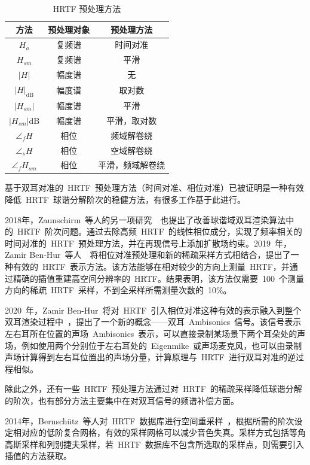 \begin{table}[H]
\caption{HRTF 预处理方法}
\centering
\begin{tabular}{|c|c|c|}
\hline
方法 & 预处理对象 & 预处理方法 \\
\hline
$H_{a}$ & 复频谱 & 时间对准 \\
$H_{s m}$ & 复频谱 & 平滑 \\
$|H|$ & 幅度谱 & 无 \\
$|H|_{\mathrm{dB}}$ & 幅度谱 & 取对数 \\
$\left|H_{s m}\right|$ & 幅度谱 & 平滑 \\
$\left|H_{s m}\right| \mathrm{d} \mathrm{B}$ & 幅度谱 & 平滑，取对数\\
$\angle_{f} H$ & 相位 & 频域解卷绕 \\
$\angle_{s} H$ & 相位 & 空域解卷绕 \\
$\angle_{f} H_{s m}$ & 相位 & 平滑，频域解卷绕\\
\hline
\end{tabular}
\label{tab.pre_processing}
\end{table}


基于双耳对准的~HRTF~预处理方法（时间对准、相位对准）已被证明是一种有效降低~HRTF~球谐分解阶次的稳健方法，有很多工作基于此进行。

2018年，Zaunschirm~等人的另一项研究~~也提出了改善球谐域双耳渲染算法中的~HRTF~阶次问题。通过去除高频~HRTF~的线性相位成分，实现了频率相关的时间对准的~HRTF~预处理方法，并在再现信号上添加扩散场约束。2019~年，Zamir Ben-Hur~等人~~将相位对准预处理和新的稀疏采样方式相结合，提出了一种有效的~HRTF~表示方法。该方法能够在相对较少的方向上测量~HRTF，并通过精确的插值重建高空间分辨率的~HRTF。结果表明，该方法仅需要~100~个测量方向的稀疏~HRTF~采样，不到全采样所需测量次数的~10$\%$。

2020~年，Zamir Ben-Hur~将对~HRTF~引入相位对准这种有效的表示融入到整个双耳渲染过程中~，提出了一个新的概念——双耳~Ambisonics~信号。该信号表示左右耳所在位置的声场~Ambisonics~表示，可以直接录制某场景下两个耳朵处的声场，例如使用两个分别位于左右耳处的~Eigenmike~或声场麦克风，也可以由录制声场计算得到左右耳位置出的声场分量，计算原理与~HRTF~进行双耳对准的逆过程相似。

除此之外，还有一些~HRTF~预处理方法通过对~HRTF~的稀疏采样降低球谐分解的阶次，也有部分方法主要集中在对双耳信号的频谱补偿方面。


2014年，Bernschütz~等人对~HRTF~数据库进行空间重采样~，根据所需的阶次设定相对应的低阶复合网格，有效的采样网格可以减少音色失真。采样方式包括等角高斯采样和列别捷夫采样，若~HRTF~数据库不包含所选取的采样点，则需要引入插值的方法获取。


